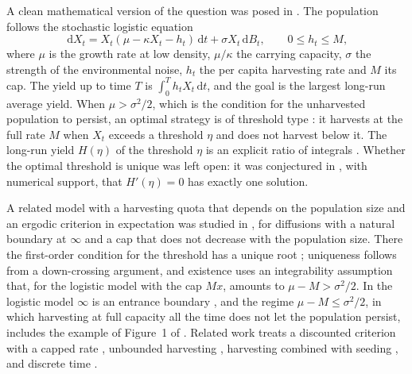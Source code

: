 \documentclass[11pt]{article}
\theoremstyle{definition}
\newcommand{\dd}{\,\mathrm{d}}
\begin{document}
A clean mathematical version of the question was posed in \cite{hening19}. The population follows the stochastic
logistic equation
\begin{equation}\label{eq:model}
  \dd X_t = X_t(\mu - \kappa X_t - h_t)\dd t + \sigma X_t \dd B_t ,\qquad 0 \le h_t \le M,
\end{equation}
where $\mu$ is the growth rate at low density, $\mu/\kappa$ the carrying capacity, $\sigma$ the strength of the
environmental noise, $h_t$ the per capita harvesting rate and $M$ its cap. The yield up to time $T$ is
$\int_0^T h_t X_t \dd t$, and the goal is the largest long-run average yield. When $\mu > \sigma^2/2$, which is
the condition for the unharvested population to persist, an optimal strategy is of threshold type
\cite[Theorem~2.1]{hening19}: it harvests at the full rate $M$ when $X_t$ exceeds a threshold $\eta$ and does not
harvest below it. The long-run yield $H(\eta)$ of the threshold $\eta$ is an explicit ratio of integrals
\cite[eq.~(4.4)]{hening19}. Whether the optimal threshold is unique was left open: it was conjectured in
\cite[Conjecture~4.1]{hening19}, with numerical support, that $H'(\eta) = 0$ has exactly one solution.

A related model with a harvesting quota that depends on the population size and an ergodic criterion in
expectation was studied in \cite{ekstrom26}, for diffusions with a natural boundary at $\infty$ and a cap that
does not decrease with the population size. There the first-order condition for the threshold has a unique root
\cite[Lemma~5.4]{ekstrom26}; uniqueness follows from a down-crossing argument, and existence uses an
integrability assumption that, for the logistic model with the cap $Mx$, amounts to $\mu - M > \sigma^2/2$. In
the logistic model $\infty$ is an entrance boundary \cite[Section~4]{hening19}, and the regime
$\mu - M \le \sigma^2/2$, in which harvesting at full capacity all the time does not let the population persist,
includes the example of Figure~1 of \cite{hening19}.
Related work treats a discounted criterion with a capped rate \cite{alvarez98}, unbounded harvesting
\cite{alvarezhening22}, harvesting combined with seeding \cite{heningtran20}, and discrete time
\cite{hening21}.
\end{document}
